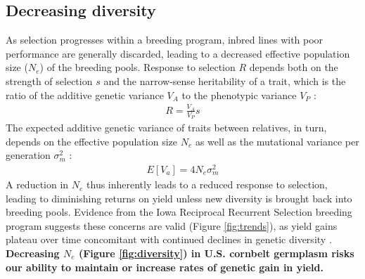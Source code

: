 \documentclass[draft,12pt]{article}
\begin{document}

\subsection*{Decreasing diversity} 

As selection progresses within a breeding program, inbred lines with poor performance are generally discarded, leading to a decreased effective population size ($N_e$) of the breeding pools.
Response to selection $R$ depends both on the strength of selection $s$ and the narrow-sense heritability of a trait, which is the ratio of the additive genetic variance $V_A$ to the phenotypic variance $V_P$ \citep{kelly2011breeder}:
\begin{align*}
R=\frac{V_A}{V_P}s
\end{align*}
The expected additive genetic variance of traits between relatives, in turn, depends on the effective population size $N_e$ as well as the mutational variance per generation ${\sigma}_m^2$ \citep{whitlock1999neutral}:
\begin{align*}
E[V_a] = 4N_e {\sigma}_m^2
\end{align*}
A reduction in $N_e$ thus inherently leads to a reduced response to  selection, leading to diminishing returns on yield unless new diversity is brought back into breeding pools.
Evidence from the Iowa Reciprocal Recurrent Selection breeding program suggests these concerns are valid (Figure \ref{fig:trends}), as yield gains plateau over time \citep{rouse2003selection} concomitant with continued declines in genetic diversity \citep{Gerke:2013tw}.
\textbf{ Decreasing $N_e$ (Figure \ref{fig:diversity}) in U.S. cornbelt germplasm risks our ability to maintain or increase rates of genetic gain in yield.} 


\end{document}
